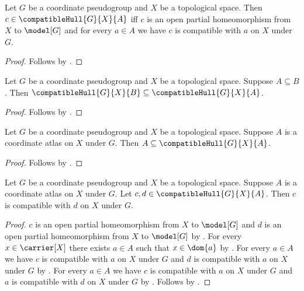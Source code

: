 \begin{theorem}\label{compatible_hull_iff}
    Let $G$ be a coordinate pseudogroup and $X$ be a topological space.
    Then $c\in\compatibleHull{G}{X}{A}$ iff
        $c$ is an open partial homeomorphism from $X$ to $\model[G]$ and
        for every $a\in A$ we have $c$ is compatible with $a$ on $X$ under $G$.
\end{theorem}
\begin{proof}
    Follows by .
\end{proof}

\begin{theorem}\label{compatible_hull_antitone}
    Let $G$ be a coordinate pseudogroup and $X$ be a topological space.
    Suppose $A\subseteq B$.
    Then $\compatibleHull{G}{X}{B}\subseteq\compatibleHull{G}{X}{A}$.
\end{theorem}
\begin{proof}
    Follows by .
\end{proof}

\begin{theorem}\label{atlas_subset_compatible_hull}
    Let $G$ be a coordinate pseudogroup and $X$ be a topological space.
    Suppose $A$ is a coordinate atlas on $X$ under $G$.
    Then $A\subseteq\compatibleHull{G}{X}{A}$.
\end{theorem}
\begin{proof}
    Follows by .
\end{proof}

\begin{theorem}\label{compatible_hull_pairwise}
    Let $G$ be a coordinate pseudogroup and $X$ be a topological space.
    Suppose $A$ is a coordinate atlas on $X$ under $G$.
    Let $c,d\in\compatibleHull{G}{X}{A}$.
    Then $c$ is compatible with $d$ on $X$ under $G$.
\end{theorem}
\begin{proof}
    $c$ is an open partial homeomorphism from $X$ to $\model[G]$ and
        $d$ is an open partial homeomorphism from $X$ to $\model[G]$ by
        .
    For every $x\in\carrier[X]$ there exists $a\in A$ such that $x\in\dom{a}$ by
        .
    For every $a\in A$ we have $c$ is compatible with $a$ on $X$ under $G$ and
        $d$ is compatible with $a$ on $X$ under $G$ by .
    For every $a\in A$ we have $c$ is compatible with $a$ on $X$ under $G$ and
        $a$ is compatible with $d$ on $X$ under $G$ by
        .
    Follows by .
\end{proof}

